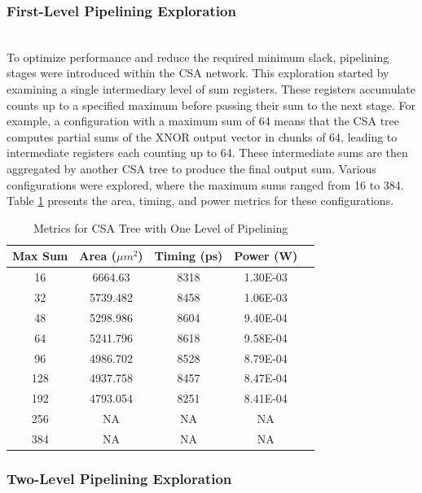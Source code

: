 \documentclass[conference]{IEEEtran}
\begin{document}
\subsubsection{First-Level Pipelining Exploration}
\hfill\\

To optimize performance and reduce the required minimum slack, pipelining stages were introduced within the CSA network. This exploration started by examining a single intermediary level of sum registers. These registers accumulate counts up to a specified maximum before passing their sum to the next stage. For example, a configuration with a maximum sum of 64 means that the CSA tree computes partial sums of the XNOR output vector in chunks of 64, leading to intermediate registers each counting up to 64. These intermediate sums are then aggregated by another CSA tree to produce the final output sum. Various configurations were explored, where the maximum sums ranged from 16 to 384. Table \ref{tab:first_level} presents the area, timing, and power metrics for these configurations.


\begin{table}[h]
    \centering
    \caption{Metrics for CSA Tree with One Level of Pipelining}
    \label{tab:first_level}
    \begin{tabular}{@{}ccccc@{}}
        \toprule
        \textbf{Max Sum} & \textbf{Area ($\mu m^2$)} & \textbf{Timing (ps)} & \textbf{Power (W)} \\
        \midrule
        16 & 6664.63 & 8318 & 1.30E-03 \\
        32 & 5739.482 & 8458 & 1.06E-03 \\
        48 & 5298.986 & 8604 & 9.40E-04 \\
        64 & 5241.796 & 8618 & 9.58E-04 \\
        96 & 4986.702 & 8528 & 8.79E-04 \\
        128 & 4937.758 & 8457 & 8.47E-04 \\
        192 & 4793.054 & 8251 & 8.41E-04 \\
        256 & NA & NA & NA \\
        384 & NA & NA & NA \\
        \bottomrule
    \end{tabular}
\end{table}

\subsubsection{Two-Level Pipelining Exploration}
\hfill\\
\end{document}
